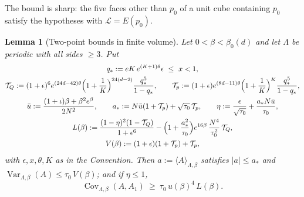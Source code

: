 \documentclass[11pt,a4paper]{article}
\newtheorem{lemma}[theorem]{Lemma}
\theoremstyle{definition}
\theoremstyle{remark}
\DeclareMathOperator{\Cov}{Cov}
\DeclareMathOperator{\Var}{Var}
\begin{document}
The bound is sharp: the five faces other than $p_0$ of a unit cube containing $p_0$ satisfy the hypotheses with $\mathcal L=E(p_0)$.

\begin{lemma}[Two-point bounds in finite volume]\label{mg:lem:twopoint}
Let $0<\beta<\beta_0(d)$ and let $\Lambda$ be periodic with all sides $\ge3$. Put
\begin{gather*}
q_*:=eK\,e^{(K+1)\theta}\epsilon\ \le\ x<1,\\
\mathcal T_Q:=(1+\epsilon)^6e^{(24d-42)\theta}\Bigl(1+\frac1K\Bigr)^{24(d-2)}\frac{q_*^5}{1-q_*},\qquad
\mathcal T_p:=(1+\epsilon)e^{(8d-11)\theta}\Bigl(1+\frac1K\Bigr)^{K}\frac{q_*^5}{1-q_*},\\
\bar u:=\frac{(1+\iota)\beta+\beta^2e^\beta}{2N^2},\qquad a_*:=N\bar u(1+\mathcal T_p)+\sqrt{\tau_0}\,\mathcal T_p,\qquad
\eta:=\frac{\epsilon}{\sqrt{\tau_0}}+\frac{a_*N\bar u}{\tau_0},\\
L(\beta):=\frac{(1-\eta)^2(1-\mathcal T_Q)}{1+\epsilon^6}-\Bigl(1+\frac{a_*^2}{\tau_0}\Bigr)e^{16\beta}\,\frac{N^4}{\tau_0^2}\,\mathcal T_Q,\\
V(\beta):=(1+\epsilon)(1+\mathcal T_p)+\mathcal T_p ,
\end{gather*}
with $\epsilon,x,\theta,K$ as in the Convention. Then $a:=\langle A\rangle_{\Lambda,\beta}$ satisfies $|a|\le a_*$ and
$\Var_{\Lambda,\beta}(A)\le\tau_0\,V(\beta)$; and if $\eta\le1$,
\[
\Cov_{\Lambda,\beta}(A,A_1)\ \ge\ \tau_0\,u(\beta)^4\,L(\beta).
\]
\end{lemma}
\end{document}

